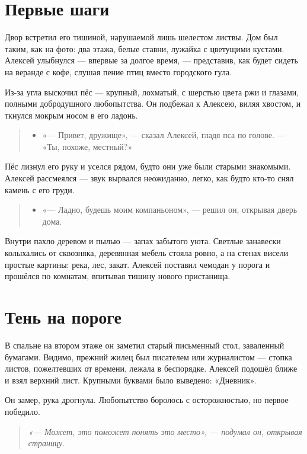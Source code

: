 \documentclass[12pt,a4paper]{book}
\newenvironment{dialogue}{\begin{quote}\itshape\begin{itemize}\item[]}{\end{itemize}\end{quote}}
\newenvironment{innerthought}{\begin{quote}\small\itshape}{\end{quote}}
\begin{document}
\section{Первые шаги}

Двор встретил его тишиной, нарушаемой лишь шелестом листвы. Дом был таким, как на фото: два этажа, белые ставни, лужайка с цветущими кустами. Алексей улыбнулся — впервые за долгое время, — представив, как будет сидеть на веранде с кофе, слушая пение птиц вместо городского гула.

Из-за угла выскочил пёс — крупный, лохматый, с шерстью цвета ржи и глазами, полными добродушного любопытства. Он подбежал к Алексею, виляя хвостом, и ткнулся мокрым носом в его ладонь.

\begin{dialogue}
«— Привет, дружище», — сказал Алексей, гладя пса по голове. — «Ты, похоже, местный?»
\end{dialogue}

Пёс лизнул его руку и уселся рядом, будто они уже были старыми знакомыми. Алексей рассмеялся — звук вырвался неожиданно, легко, как будто кто-то снял камень с его груди.

\begin{dialogue}
«— Ладно, будешь моим компаньоном», — решил он, открывая дверь дома.
\end{dialogue}

Внутри пахло деревом и пылью — запах забытого уюта. Светлые занавески колыхались от сквозняка, деревянная мебель стояла ровно, а на стенах висели простые картины: река, лес, закат. Алексей поставил чемодан у порога и прошёлся по комнатам, впитывая тишину нового пристанища.

\section{Тень на пороге}

В спальне на втором этаже он заметил старый письменный стол, заваленный бумагами. Видимо, прежний жилец был писателем или журналистом — стопка листов, пожелтевших от времени, лежала в беспорядке. Алексей подошёл ближе и взял верхний лист. Крупными буквами было выведено: «Дневник».

Он замер, рука дрогнула. Любопытство боролось с осторожностью, но первое победило.

\begin{innerthought}
«— Может, это поможет понять это место», — подумал он, открывая страницу.
\end{innerthought}
\end{document}
